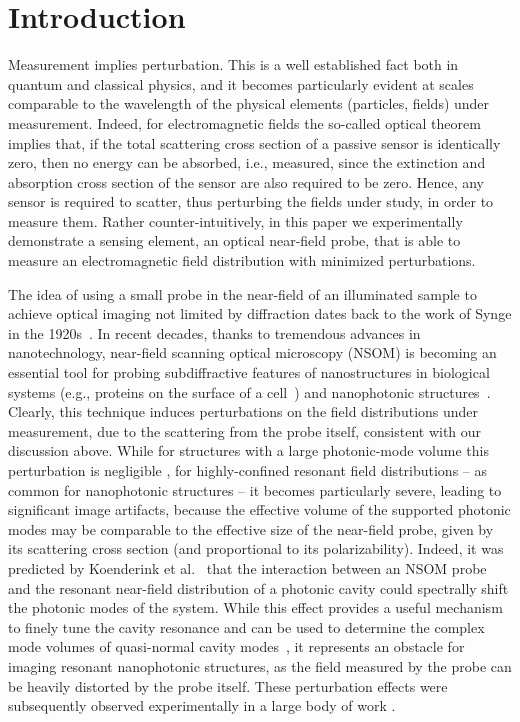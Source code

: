 \documentclass{osa-article}
\begin{document}
	
	\section{Introduction}
	Measurement implies perturbation. This is a well established fact both in quantum and classical physics, and it becomes particularly evident at scales comparable to the wavelength of the physical elements (particles, fields) under measurement. Indeed, for electromagnetic fields the so-called optical theorem \cite{jackson1999,bohren2008absorption} implies that, if the total scattering cross section of a passive sensor is identically zero, then no energy can be absorbed, i.e., measured, since the extinction and absorption cross section of the sensor are also required to be zero. Hence, any sensor is required to scatter, thus perturbing the fields under study, in order to measure them. Rather counter-intuitively, in this paper we experimentally demonstrate a sensing element, an optical near-field probe, that is able to measure an electromagnetic field distribution with minimized perturbations.\par
	
	The idea of using a small probe in the near-field of an illuminated sample to achieve optical imaging not limited by diffraction dates back to the work of Synge in the 1920s~\cite{Synge_1928}. In recent decades, thanks to tremendous advances in nanotechnology, near-field scanning optical microscopy (NSOM) is becoming an essential tool for probing subdiffractive features of nanostructures in biological systems (e.g., proteins on the surface of a cell~\cite{deLange2001}) and nanophotonic structures~\cite{Dorfmuller_2011, Schnell2009}. Clearly, this technique induces perturbations on the field distributions under measurement, due to the scattering from the probe itself, consistent with our discussion above. While for structures with a large photonic-mode volume this perturbation is negligible \cite{Balistreri_01}, for highly-confined resonant field distributions -- as common for nanophotonic structures -- it becomes particularly severe, leading to significant image artifacts, because the effective volume of the supported photonic modes may be comparable to the effective size of the near-field probe, given by its scattering cross section (and proportional to its polarizability). Indeed, it was predicted by Koenderink et al.~\cite{Koenderink_2005} that the interaction between an NSOM probe and the resonant near-field distribution of a photonic cavity could spectrally shift the photonic modes of the system. While this effect provides a useful mechanism to finely tune the cavity resonance and can be used to determine the complex mode volumes of quasi-normal cavity modes~\cite{Cognee_2019}, it represents an obstacle for imaging resonant nanophotonic structures, as the field measured by the probe can be heavily distorted by the probe itself. These perturbation effects were subsequently observed experimentally in a large body of work \cite{Lalouat_2007,Intoti_2008,Vignolini_2010,Burresi_2010}.\par 
	
\end{document}
